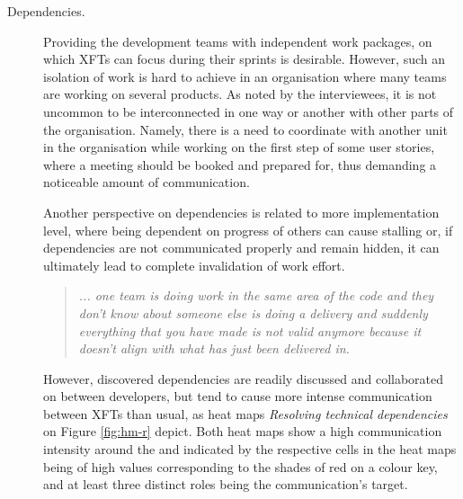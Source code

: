 \begin{description}

   \item[Dependencies.] Providing the development teams with independent work packages, on which \acp{XFT} can focus during their sprints is  desirable. However, such an isolation of work is hard to achieve in an organisation where many teams are working on several products. As noted by the interviewees, it is not uncommon to be interconnected in one way or another with other parts of the organisation. Namely, there is a need to coordinate with another unit in the organisation while working on the first step of some user stories, where a meeting should be booked and prepared for, thus demanding a noticeable amount of communication.


   Another perspective on dependencies is related to more implementation level, where being dependent on progress of others can cause stalling or, if dependencies are not communicated properly and remain hidden, it can ultimately lead to complete invalidation of work effort.



      \begin{quote}\itshape... one team is doing work in the same area of the code and they don’t know about someone else is doing a delivery and suddenly everything that you have made is not valid anymore because it doesn’t align with what has just been delivered in.
      \end{quote}

However, discovered dependencies are readily discussed and collaborated on between developers, but tend to cause more intense communication between \acp{XFT} than usual, as heat maps \emph{Resolving technical dependencies} on Figure \ref{fig:hm-r} depict. Both heat maps show a high communication intensity around the  and  indicated by the respective cells in the heat maps being of high values corresponding to the shades of red on a colour key, and at least three distinct roles being the communication's target.


\end{description}
